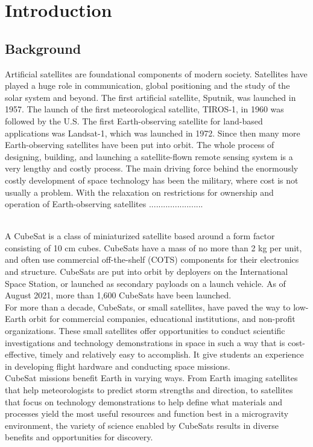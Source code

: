 \chapter{Introduction}

\justifying
\section{Background}
Artificial satellites are foundational components of modern society. Satellites have played a huge role in communication, global positioning and the study of the solar system and beyond. The first artificial satellite, Sputnik, was launched in 1957. The launch of the first
meteorological satellite, TIROS-1, in 1960 was followed by the U.S. The first Earth-observing satellite for land-based applications was Landsat-1, which was launched in 1972. Since then many more Earth-observing satellites have been put into orbit. The whole process of designing, building, and launching a satellite-flown remote sensing system is a very lengthy and costly process. The main driving force behind the enormously costly development
of space technology has been the military, where cost is not usually a problem. With the relaxation
on restrictions for ownership and operation of Earth-observing satellites .......................




\\A CubeSat is a class of miniaturized satellite based around a form factor consisting
of 10 cm cubes. CubeSats have a mass of no more than 2 kg per unit, and often use
commercial off-the-shelf (COTS) components for their electronics and structure.
CubeSats are put into orbit by deployers on the International Space Station, or
launched as secondary payloads on a launch vehicle. As of August 2021, more than
1,600 CubeSats have been launched.
\\

For more than a decade, CubeSats, or small satellites, have paved the way to
low-Earth orbit for commercial companies, educational institutions, and non-profit
organizations. These small satellites offer opportunities to conduct scientific
investigations and technology demonstrations in space in such a way that is
cost-effective, timely and relatively easy to accomplish.
It give students an
experience in developing flight hardware and conducting space missions.\\

CubeSat missions benefit Earth in varying ways. From Earth imaging satellites that
help meteorologists to predict storm strengths and direction, to satellites that focus
on technology demonstrations to help define what materials and processes yield the
most useful resources and function best in a microgravity environment, the variety
of science enabled by CubeSats results in diverse benefits and opportunities for
discovery.

